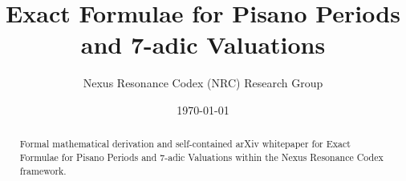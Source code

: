 \documentclass[11pt,a4paper]{article}
\title{Exact Formulae for Pisano Periods and 7-adic Valuations}
\author{Nexus Resonance Codex (NRC) Research Group}
\date{\today}
\begin{document}
\maketitle

\begin{abstract}
Formal mathematical derivation and self-contained arXiv whitepaper for Exact Formulae for Pisano Periods and 7-adic Valuations within the Nexus Resonance Codex framework.
\end{abstract}





\end{document}
